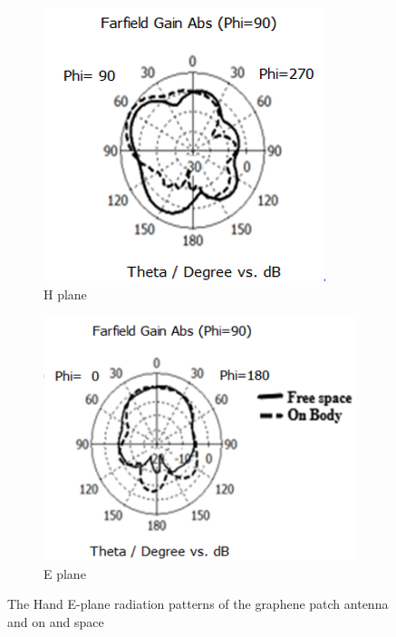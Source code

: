\documentclass[12pt]{suhbook}
\begin{document}
\begin{figure}[hbt!]
\begin{subfigure}{.5\textwidth}
\centering
\includegraphics[width=.9\linewidth]{13}
\caption{H plane}
\label{fig:sfig10a}
\end{subfigure}%
\begin{subfigure}{.6\textwidth}
  \centering
  \includegraphics[width=.9\linewidth]{14}
  \caption{E plane}
  \label{fig:sfig2}
\end{subfigure}
\caption{The Hand E-plane radiation patterns of the graphene patch antenna and on and space}
\label{fig 14b}
\end{figure}
\end{document}
